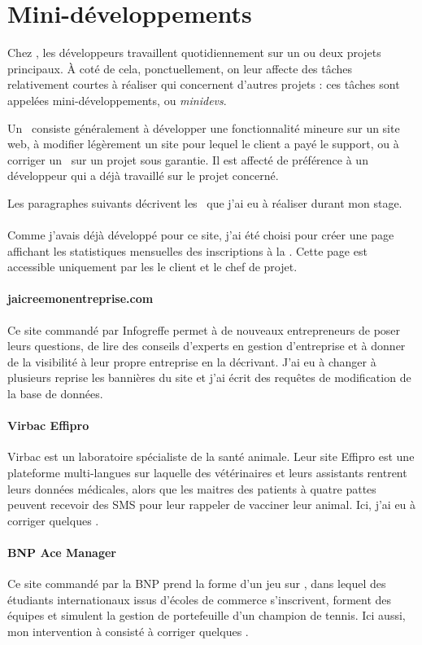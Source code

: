 \section{Mini-développements}

Chez \asl, les développeurs travaillent quotidiennement sur un ou deux projets principaux. À coté de cela, ponctuellement, on leur affecte des tâches relativement courtes à réaliser qui concernent d'autres projets : ces tâches sont appelées mini-développements, ou \emph{minidevs}.

Un \aminidev\ consiste généralement à développer une fonctionnalité mineure sur un site web, à modifier légèrement un site pour lequel le client a payé le support, ou à corriger un \abug\ sur un projet sous garantie. Il est affecté de préférence à un développeur qui a déjà travaillé sur le projet concerné. 

Les paragraphes suivants décrivent les \aminidevs\ que j'ai eu à réaliser durant mon stage.

\paragraph{\alc} Comme j'avais déjà développé pour ce site, j'ai été choisi pour créer une page affichant les statistiques mensuelles des inscriptions à la \anewsletter. Cette page est accessible uniquement par les le client et le chef de projet.

\paragraph{jaicreemonentreprise.com} Ce site commandé par Infogreffe permet à de nouveaux entrepreneurs de poser leurs questions, de lire des conseils d'experts en gestion d'entreprise et à donner de la visibilité à leur propre entreprise en la décrivant. J'ai eu à changer à plusieurs reprise les bannières du site et j'ai écrit des requêtes de modification de la base de données.

\paragraph{Virbac Effipro} Virbac est un laboratoire spécialiste de la santé animale. Leur site Effipro est une plateforme multi-langues sur laquelle des vétérinaires et leurs assistants rentrent leurs données médicales, alors que les maitres des patients à quatre pattes peuvent recevoir des SMS pour leur rappeler de vacciner leur animal. Ici, j'ai eu à corriger quelques \abugs.

\paragraph{BNP Ace Manager} Ce site commandé par la BNP prend la forme d'un jeu sur \ainternet, dans lequel des étudiants internationaux issus d'écoles de commerce s'inscrivent, forment des équipes et simulent la gestion de portefeuille d'un champion de tennis. Ici aussi, mon intervention à consisté à corriger quelques \abugs.
